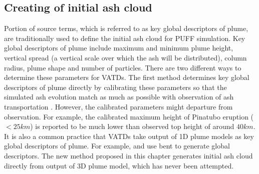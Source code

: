 \subsection{Creating of initial ash cloud}

Portion of source terms, which is referred to as key global descriptors of plume, are traditionally used to define the initial ash cloud for PUFF simulation. Key global descriptors of plume include maximum and minimum plume height, vertical spread (a vertical scale over which the ash will be distributed), column radius, plume shape and number of particles. There are two different ways to determine these parameters for VATDs. The first method determines key global descriptors of plume directly by calibrating these parameters so that the simulated ash evolution match as much as possible with observation of ash transportation \citep[e.g.][]{fero2008simulation,fero2009simulating}. However, the calibrated parameters might departure from observation. For example, the calibrated maximum height of Pinatubo eruption ($<25 km$) is reported to be much lower \citep{fero2009simulating} than observed top height of around $40 km$. It is also a common practice that VATDs take output of 1D plume models as key global descriptors of plume. For example, \citet{bursik2012estimation} and \citet{ stefanescu2014temporal} use bent \citep{bursik2001effect} to generate global descriptors. The new method proposed in this chapter generates initial ash cloud directly from output of 3D plume model, which has never been attempted.
%

